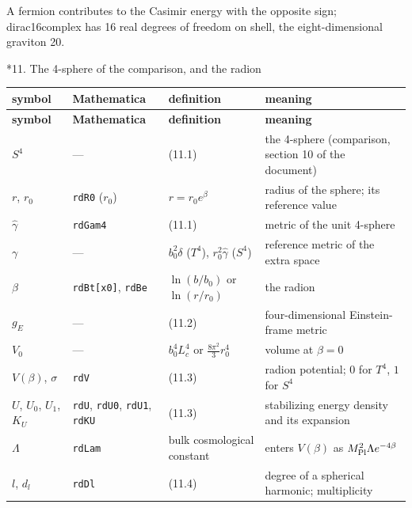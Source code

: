 \documentclass[10pt,a4paper]{article}
\makeatletter
\renewcommand\section{\@startsection{section}{1}{\z@}{-3.5ex \@plus -1ex \@minus -.2ex}{2.3ex \@plus.2ex}{\normalfont\Large\bfseries\raggedright}}
\makeatother
\begin{document}
A fermion contributes to the Casimir energy with the opposite sign; dirac16complex has 16 real degrees of freedom on shell, the eight-dimensional graviton 20.

\section*{11. The 4-sphere of the comparison, and the radion}
{\small
\begin{longtable}{>{\raggedright\arraybackslash}p{}>{\raggedright\arraybackslash}p{}>{\raggedright\arraybackslash}p{}>{\raggedright\arraybackslash}p{}}
\toprule
\textbf{symbol} & \textbf{Mathematica} & \textbf{definition} & \textbf{meaning} \\
\midrule\endfirsthead
\toprule
\textbf{symbol} & \textbf{Mathematica} & \textbf{definition} & \textbf{meaning} \\
\midrule\endhead
\endfoot
\bottomrule\endlastfoot
$S^4$ & — & (11.1) & the 4-sphere (comparison, section 10 of the document) \\
$r$, $r_0$ & \texttt{rdR0} ($r_0$) & $r=r_0e^\beta$ & radius of the sphere; its reference value \\
$\hat\gamma$ & \texttt{rdGam4} & (11.1) & metric of the unit 4-sphere \\
$\gamma$ & — & $b_0^2\delta$ ($T^4$), $r_0^2\hat\gamma$ ($S^4$) & reference metric of the extra space \\
$\beta$ & \texttt{rdBt[x0]}, \texttt{rdBe} & $\ln(b/b_0)$ or $\ln(r/r_0)$ & the radion \\
$g_E$ & — & (11.2) & four-dimensional Einstein-frame metric \\
$V_0$ & — & $b_0^4L_c^4$ or $\frac{8\pi^2}3r_0^4$ & volume at $\beta=0$ \\
$V(\beta)$, $\sigma$ & \texttt{rdV} & (11.3) & radion potential; $0$ for $T^4$, $1$ for $S^4$ \\
$U$, $U_0$, $U_1$, $K_U$ & \texttt{rdU}, \texttt{rdU0}, \texttt{rdU1}, \texttt{rdKU} & (11.3) & stabilizing energy density and its expansion \\
$\Lambda$ & \texttt{rdLam} & bulk cosmological constant & enters $V(\beta)$ as $M_{\rm Pl}^2\Lambda e^{-4\beta}$ \\
$l$, $d_l$ & \texttt{rdDl} & (11.4) & degree of a spherical harmonic; multiplicity \\

\end{longtable}}
\end{document}
